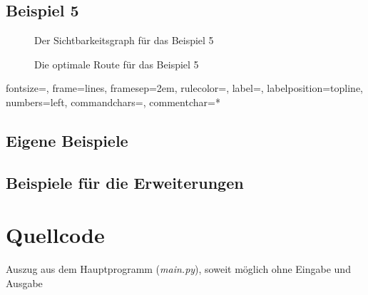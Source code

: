 \documentclass[a4paper, notitlepage, 12pt]{scrartcl}
\newenvironment{longlisting}{\captionsetup{type=listing}}{}
\begin{document}
\subsection{Beispiel 5}
\begin{minipage}[b]{0.45\linewidth}
	\begin{figure}[H]
		
		\caption{Der Sichtbarkeitsgraph für das Beispiel 5}
	\end{figure}
\end{minipage}
\hspace{0.5cm}
\begin{minipage}[b]{0.45\linewidth}
	\begin{figure}[H] 
		\caption{Die optimale Route für das Beispiel 5}
	\end{figure}
\end{minipage}
{fontsize=\footnotesize,
	frame=lines,  %
	framesep=2em, %
	rulecolor=\color{Gray},
	label=,
	labelposition=topline,
	numbers=left,
	commandchars=\|\(\), %
	commentchar=*        %
}
\subsection{Eigene Beispiele}
\subsection{Beispiele für die Erweiterungen}

 \section{Quellcode}
 \renewcommand{\listingscaption}{Quellcode}
 
 \begin{longlisting}
 	\caption{Auszug aus dem Hauptprogramm (\textit{main.py}), soweit möglich ohne Eingabe und Ausgabe}
 \end{longlisting}

 
 
\end{document}
